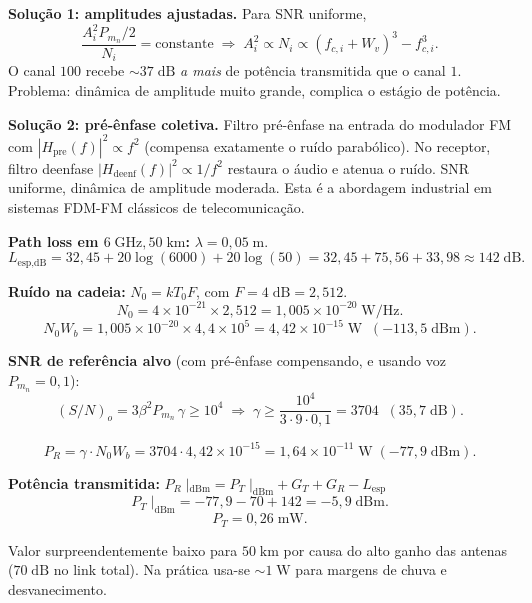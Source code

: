 \documentclass[11pt,a4paper]{article}
\begin{document}
\begin{resolucao}

\textbf{Solução 1: amplitudes ajustadas.} Para SNR uniforme,
\[
  \frac{A_i^2 P_{m_n}/2}{N_i} = \text{constante} \;\Rightarrow\; A_i^2 \propto N_i \propto (f_{c,i}+W_v)^3 - f_{c,i}^3.
\]
O canal $100$ recebe $\sim 37\;\text{dB}$ \emph{a mais} de potência transmitida que o canal $1$. Problema: dinâmica de amplitude muito grande, complica o estágio de potência.

\textbf{Solução 2: pré-ênfase coletiva.} Filtro pré-ênfase na entrada do modulador FM com $|H_{\text{pre}}(f)|^2 \propto f^2$ (compensa exatamente o ruído parabólico). No receptor, filtro deenfase $|H_{\text{deenf}}(f)|^2 \propto 1/f^2$ restaura o áudio e atenua o ruído. SNR uniforme, dinâmica de amplitude moderada. Esta é a abordagem industrial em sistemas FDM-FM clássicos de telecomunicação.
\end{resolucao}

\begin{resolucao}

\textbf{Path loss em $6\;\text{GHz}, 50\;\text{km}$:} $\lambda = 0{,}05\;\text{m}$.
\[
  L_{\text{esp},\text{dB}} = 32{,}45 + 20\log(6000) + 20\log(50) = 32{,}45 + 75{,}56 + 33{,}98 \approx 142\;\text{dB}.
\]

\textbf{Ruído na cadeia:} $N_0 = kT_0 F$, com $F = 4\;\text{dB} = 2{,}512$.
\[
  N_0 = 4\times 10^{-21}\times 2{,}512 = 1{,}005\times 10^{-20}\;\text{W/Hz}.
\]
\[
  N_0 W_b = 1{,}005\times 10^{-20}\times 4{,}4\times 10^5 = 4{,}42\times 10^{-15}\;\text{W} \;\;(-113{,}5\;\text{dBm}).
\]

\textbf{SNR de referência alvo} (com pré-ênfase compensando, e usando voz $P_{m_n} = 0{,}1$):
\[
  (S/N)_o = 3\beta^2 P_{m_n}\,\gamma \ge 10^4
  \;\Rightarrow\; \gamma \ge \frac{10^4}{3\cdot 9\cdot 0{,}1} = 3704 \;\;(35{,}7\;\text{dB}).
\]

\[
  P_R = \gamma\cdot N_0 W_b = 3704 \cdot 4{,}42\times 10^{-15} = 1{,}64\times 10^{-11}\;\text{W} \;(-77{,}9\;\text{dBm}).
\]

\textbf{Potência transmitida:} $P_R\;|_{\text{dBm}} = P_T\;|_{\text{dBm}} + G_T + G_R - L_{\text{esp}}$
\[
  P_T\;|_{\text{dBm}} = -77{,}9 - 70 + 142 = -5{,}9\;\text{dBm}.
\]
\[
  \boxed{P_T = 0{,}26\;\text{mW}.}
\]

Valor surpreendentemente baixo para $50\;\text{km}$ por causa do alto ganho das antenas ($70\;\text{dB}$ no link total). Na prática usa-se $\sim 1\;\text{W}$ para margens de chuva e desvanecimento.
\end{resolucao}
\end{document}
